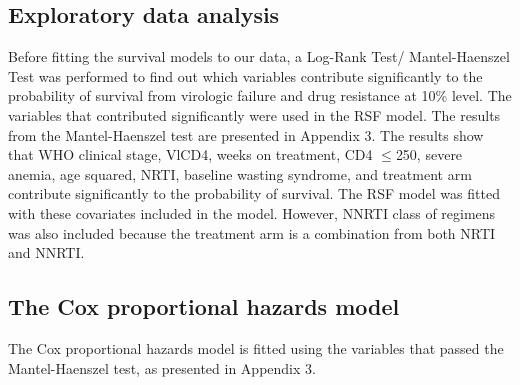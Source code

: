 \documentclass[10pt]{NSP1}
\begin{document}
\subsection{Exploratory data analysis}
Before fitting the survival models to our data, a Log-Rank Test/ Mantel-Haenszel Test was performed to find out which variables contribute significantly to the probability of survival from virologic failure and drug resistance at 10\% level. The variables that contributed significantly were used in the RSF model. The results from the Mantel-Haenszel test are presented in Appendix 3. The results show that WHO clinical stage, VlCD4, weeks on treatment, CD4 $\leq$250, severe anemia, age squared, NRTI, baseline wasting syndrome, and treatment arm contribute significantly to the probability of survival. The RSF model was fitted with these covariates included in the model. However, NNRTI class of regimens was also included because the treatment arm is a combination from both NRTI and NNRTI. 


\subsection{The Cox proportional hazards model}
The Cox proportional hazards model is fitted using the variables that passed the Mantel-Haenszel test, as presented in Appendix 3. 
\end{document}
